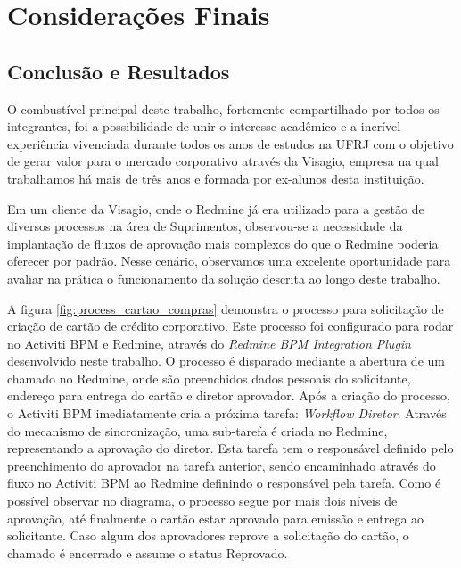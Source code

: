 \chapter{Considerações Finais}\label{chp:conclusao}

\section{Conclusão e Resultados}\label{sec:conclusao-resultados}

O combustível principal deste trabalho, fortemente compartilhado por todos os integrantes, foi a possibilidade de unir o interesse acadêmico e a incrível experiência vivenciada durante todos os anos de estudos na UFRJ com o objetivo de gerar valor para o mercado corporativo através da Visagio\cite{visagio}, empresa na qual trabalhamos há mais de três anos e formada por ex-alunos desta instituição.

Em um cliente da Visagio, onde o Redmine já era utilizado para a gestão de diversos processos na área de Suprimentos, observou-se a necessidade da implantação de fluxos de aprovação mais complexos do que o Redmine poderia oferecer por padrão. Nesse cenário, observamos uma excelente oportunidade para avaliar na prática o funcionamento da solução descrita ao longo deste trabalho.

A figura \ref{fig:process_cartao_compras} demonstra o processo para solicitação de criação de cartão de crédito corporativo. Este processo foi configurado para rodar no Activiti BPM e Redmine, através do \textit{Redmine BPM Integration Plugin} desenvolvido neste trabalho. O processo é disparado mediante a abertura de um chamado no Redmine, onde são preenchidos dados pessoais do solicitante, endereço para entrega do cartão e diretor aprovador. Após a criação do processo, o Activiti BPM imediatamente cria a próxima tarefa: \textit{Workflow Diretor}. Através do mecanismo de sincronização, uma sub-tarefa é criada no Redmine, representando a aprovação do diretor. Esta tarefa tem o responsável definido pelo preenchimento do aprovador na tarefa anterior, sendo encaminhado através do fluxo no Activiti BPM ao Redmine definindo o responsável pela tarefa. Como é possível observar no diagrama, o processo segue por mais dois níveis de aprovação, até finalmente o cartão estar aprovado para emissão e entrega ao solicitante. Caso algum dos aprovadores reprove a solicitação do cartão, o chamado é encerrado e assume o status Reprovado.

